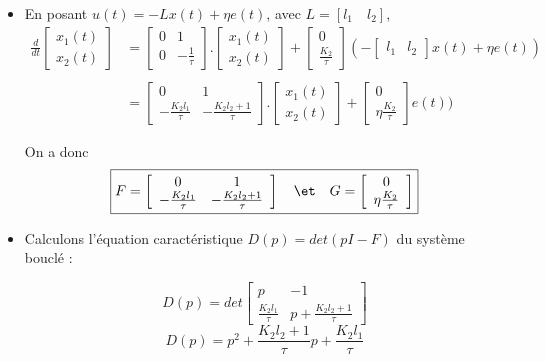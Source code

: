 \documentclass[../../Cours_M1.tex]{subfiles}
\begin{document}
\begin{itemize}
\item En posant $u(t) = -Lx(t) + \eta e(t)$, avec $L=[l_1 \quad l_2]$, 
\begin{align*}
\frac{d}{dt} \left[\begin{array}{c}
x_1(t) \\
x_2(t)
\end{array} \right]
 & = \left[\begin{array}{cc}
0 & 1 \\
0 & -\frac{1}{\tau}
\end{array} \right]
.
\left[\begin{array}{c}
x_1(t) \\
x_2(t)
\end{array} \right] + \left[\begin{array}{c}
0 \\
\frac{K_2}{\tau}
\end{array} \right] (-\left[\begin{array}{cc}
l_1 & l_2
\end{array}\right]x(t) + \eta e(t)) \\
\\
& = \left[\begin{array}{cc}
0 & 1 \\
-\frac{K_2l_1}{\tau} & -\frac{K_2l_2 +1}{\tau}
\end{array} \right]
.
\left[\begin{array}{c}
x_1(t) \\
x_2(t)
\end{array} \right] + \left[\begin{array}{c}
0 \\
\eta \frac{K_2}{\tau}
\end{array} \right] e(t))
\end{align*}

On a donc
\[ \boxed{F = \left[\begin{array}{cc}
0 & 1 \\
-\frac{K_2l_1}{\tau} & -\frac{K_2l_2 +1}{\tau}
\end{array} \right] \quad \et \quad G = \left[\begin{array}{c}
0 \\
\eta \frac{K_2}{\tau}
\end{array} \right] } \]

\item Calculons l'équation caractéristique $D(p)= det(pI-F)$ du système bouclé :

\[ D(p) = det
\left[\begin{array}{cc}
p & -1 \\
\frac{K_2l_1}{\tau} & p+\frac{K_2l_2 +1}{\tau}
\end{array} \right] \]
\[\boxed{D(p) = p^2 + \frac{K_2l_2 +1}{\tau}p + \frac{K_2l_1}{\tau}}\]


\end{itemize}
\end{document}
